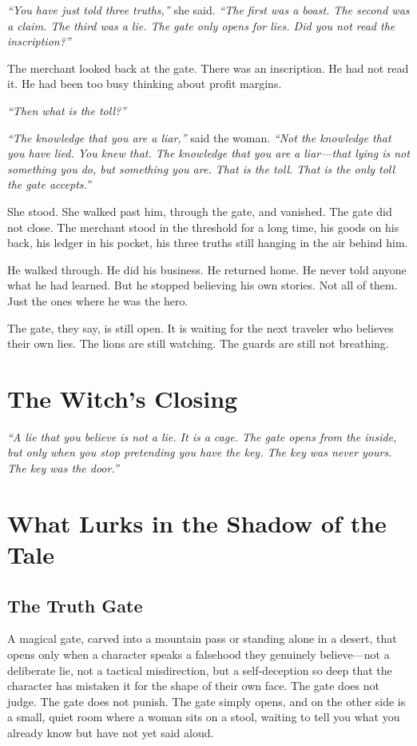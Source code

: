 \textit{``You have just told three truths,''} she said. \textit{``The first was a boast. The second was a claim. The third was a lie. The gate only opens for lies. Did you not read the inscription?''}

The merchant looked back at the gate. There was an inscription. He had not read it. He had been too busy thinking about profit margins.

\textit{``Then what is the toll?''}

\textit{``The knowledge that you are a liar,''} said the woman. \textit{``Not the knowledge that you have lied. You knew that. The knowledge that you are a liar---that lying is not something you do, but something you are. That is the toll. That is the only toll the gate accepts.''}

She stood. She walked past him, through the gate, and vanished. The gate did not close. The merchant stood in the threshold for a long time, his goods on his back, his ledger in his pocket, his three truths still hanging in the air behind him.

He walked through. He did his business. He returned home. He never told anyone what he had learned. But he stopped believing his own stories. Not all of them. Just the ones where he was the hero.

The gate, they say, is still open. It is waiting for the next traveler who believes their own lies. The lions are still watching. The guards are still not breathing.

\section*{The Witch's Closing}
\textit{``A lie that you believe is not a lie. It is a cage. The gate opens from the inside, but only when you stop pretending you have the key. The key was never yours. The key was the door.''}

\section*{What Lurks in the Shadow of the Tale}

\subsection*{The Truth Gate}

A magical gate, carved into a mountain pass or standing alone in a desert, that opens only when a character speaks a falsehood they genuinely believe---not a deliberate lie, not a tactical misdirection, but a self-deception so deep that the character has mistaken it for the shape of their own face. The gate does not judge. The gate does not punish. The gate simply opens, and on the other side is a small, quiet room where a woman sits on a stool, waiting to tell you what you already know but have not yet said aloud.

